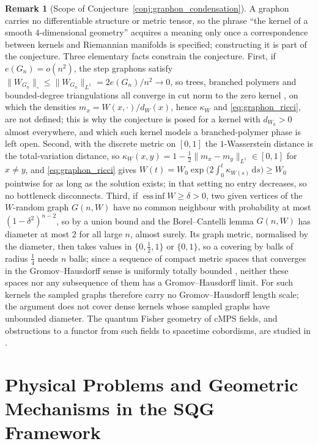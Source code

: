 \documentclass[11pt,a4paper,reqno]{amsart}
\theoremstyle{definition}
\newtheorem{remark}[theorem]{Remark}
\numberwithin{equation}{section}
\newcommand{\cutnorm}[1]{\|#1\|_{\square}}
\newcommand{\dif}{\,\mathrm{d}}
\begin{document}
\begin{remark}[Scope of Conjecture~\ref{conj:graphon_condensation}]
\label{rem:graphon_scope}
A graphon carries no differentiable structure or metric tensor, so the phrase ``the kernel of a smooth $4$-dimensional geometry'' acquires a meaning only once a correspondence between kernels and Riemannian manifolds is specified; constructing it is part of the conjecture. Three elementary facts constrain the conjecture. First, if $e(G_n) = o(n^2)$, the step graphons satisfy $\cutnorm{W_{G_n}} \le \|W_{G_n}\|_{L^1} = 2e(G_n)/n^2 \to 0$, so trees, branched polymers and bounded-degree triangulations all converge in cut norm to the zero kernel \cite{borgs2008convergent}, on which the densities $m_x = W(x,\cdot)/d_W(x)$, hence $\kappa_W$ and \eqref{eq:graphon_ricci}, are not defined; this is why the conjecture is posed for a kernel with $d_{W_0} > 0$ almost everywhere, and which such kernel models a branched-polymer phase is left open. Second, with the discrete metric on $[0,1]$ the $1$-Wasserstein distance is the total-variation distance, so $\kappa_W(x,y) = 1 - \tfrac12\|m_x - m_y\|_{L^1} \in [0,1]$ for $x \ne y$, and \eqref{eq:graphon_ricci} gives $W(t) = W_0 \exp\bigl(2\int_0^t \kappa_{W(s)}\dif s\bigr) \ge W_0$ pointwise for as long as the solution exists; in that setting no entry decreases, so no bottleneck disconnects. Third, if $\operatorname{ess\,inf} W \ge \delta > 0$, two given vertices of the $W$-random graph $G(n,W)$ have no common neighbour with probability at most $(1-\delta^2)^{n-2}$, so by a union bound and the Borel--Cantelli lemma $G(n,W)$ has diameter at most $2$ for all large $n$, almost surely. Its graph metric, normalised by the diameter, then takes values in $\{0,\tfrac12,1\}$ or $\{0,1\}$, so a covering by balls of radius $\tfrac14$ needs $n$ balls; since a sequence of compact metric spaces that converges in the Gromov--Hausdorff sense is uniformly totally bounded \cite{burago2001course}, neither these spaces nor any subsequence of them has a Gromov--Hausdorff limit. For such kernels the sampled graphs therefore carry no Gromov--Hausdorff length scale; the argument does not cover dense kernels whose sampled graphs have unbounded diameter. The quantum Fisher geometry of cMPS fields, and obstructions to a functor from such fields to spacetime cobordisms, are studied in \cite{silvafilho2026cobordisms}.
\end{remark}

\section{Physical Problems and Geometric Mechanisms in the SQG Framework}
\label{sec:fundamental_resolutions}
\end{document}
